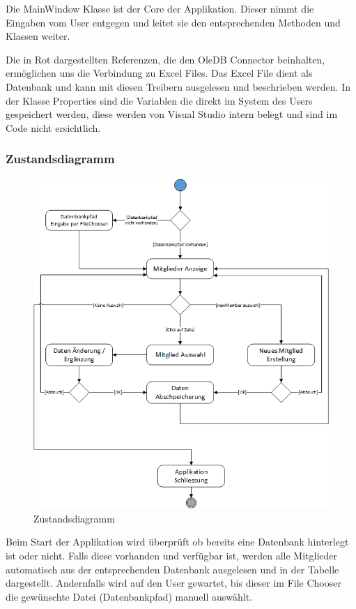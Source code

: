 \documentclass{article}
\begin{document}
Die MainWindow Klasse ist der Core der Applikation. Dieser nimmt die Eingaben vom User entgegen und leitet sie den entsprechenden Methoden und Klassen weiter. 

Die in Rot dargestellten Referenzen, die den OleDB Connector beinhalten, ermöglichen uns die Verbindung zu Excel Files. Das Excel File dient als Datenbank und kann mit diesen Treibern ausgelesen und beschrieben werden. In der Klasse Properties sind die Variablen die direkt im System des Users gespeichert werden, diese werden von Visual Studio intern belegt und sind im Code nicht ersichtlich.

\newpage


\subsubsection{Zustandsdiagramm}
\begin{figure}[h]
	\centering
	\includegraphics[width=0.9 \textwidth]{Zustandsdiagramm}
	\caption{Zustandsdiagramm}
\end{figure}

Beim Start der Applikation wird überprüft ob bereits eine Datenbank hinterlegt ist oder nicht. Falls diese vorhanden und verfügbar ist, werden alle Mitglieder automatisch aus der entsprechenden Datenbank ausgelesen und in der Tabelle dargestellt. Andernfalls wird auf den User gewartet, bis dieser im File Chooser die gewünschte Datei (Datenbankpfad) manuell auswählt. 
\end{document}
